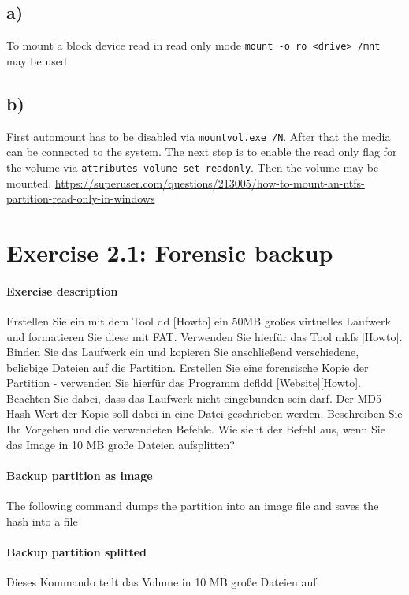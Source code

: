 \documentclass[10pt,a4paper]{article}
\begin{document}
\subsection{a)}
To mount a block device read in read only mode \Verb+mount -o ro <drive> /mnt+ may be used
\subsection{b)}
First automount has to be disabled via \Verb+mountvol.exe /N+. After that the media can be connected to the system. The next step is to enable the read only flag for the volume via \Verb+attributes volume set readonly+. Then the volume may be mounted.
\url{https://superuser.com/questions/213005/how-to-mount-an-ntfs-partition-read-only-in-windows}

\section{Exercise 2.1: Forensic backup}
\paragraph{Exercise description}
Erstellen Sie ein mit dem Tool dd [Howto] ein 50MB großes virtuelles Laufwerk und formatieren Sie diese mit FAT.
Verwenden Sie hierfür das Tool mkfs [Howto]. Binden Sie das Laufwerk ein und kopieren Sie anschließend verschiedene,
beliebige Dateien auf die Partition.
Erstellen Sie eine forensische Kopie der Partition - verwenden Sie hierfür das Programm dcfldd [Website][Howto].
Beachten Sie dabei, dass das Laufwerk nicht eingebunden sein darf. Der MD5-Hash-Wert der Kopie soll dabei in eine Datei
geschrieben werden. Beschreiben Sie Ihr Vorgehen und die verwendeten Befehle. Wie sieht der Befehl aus, wenn Sie das
Image in 10 MB große Dateien aufsplitten?
\paragraph{Backup partition as image}
The following command dumps the partition into an image file and saves the hash into a file

\paragraph{Backup partition splitted}
Dieses Kommando teilt das Volume in 10 MB große Dateien auf
\end{document}
